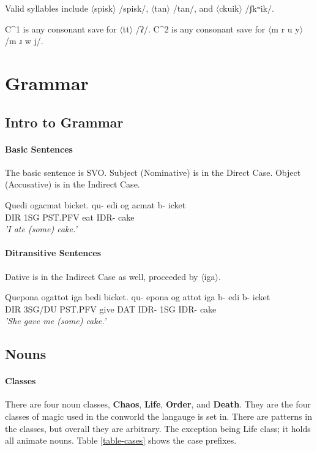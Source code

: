 \documentclass[11pt]{article}
\begin{document}
Valid syllables include 
$\langle$spisk$\rangle$ /spisk/,
$\langle$tan$\rangle$ /tan/,
and $\langle$ckuik$\rangle$ /ʃkʷik/.

C^1 is any consonant save for $\langle$tt$\rangle$ /ʔ/.
C^2 is any consonant save for $\langle$m r u y$\rangle$ /m ɹ w j/.

\newpage
\section{Grammar}

\subsection{Intro to Grammar}

\paragraph{Basic Sentences}
The basic sentence is SVO.
Subject (Nominative) is in the Direct Case.
Object (Accusative) is in the Indirect Case.

\begin{exe}
\ex \label{basicsentence}
Quedi ogacmat bicket.
\gll
qu-  edi og      acmat b-   icket\\
DIR  1SG PST.PFV eat   IDR- cake\\
\trans 
    \textit{'I ate (some) cake.'}\\
\end{exe}

\paragraph{Ditransitive Sentences}
Dative is in the Indirect Case as well, proceeded by $\langle$iga$\rangle$.

\begin{exe}
\ex \label{basicsentence}
Quepona ogattot iga bedi bicket.
\gll
qu-  epona  og      attot iga b-   edi b-   icket\\
DIR  3SG/DU PST.PFV give  DAT IDR- 1SG IDR- cake\\
\trans 
    \textit{'She gave me (some) cake.'}\\
\end{exe}


\subsection{Nouns}

\paragraph{Classes}
There are four noun classes,
\textbf{Chaos}, \textbf{Life}, \textbf{Order}, and \textbf{Death}.
They are the four classes of magic used in the conworld the langauge is set in.
There are patterns in the classes, but overall they are arbitrary.
The exception being Life class;
it holds all animate nouns.
Table \ref{table-cases} shows the case prefixes.
\end{document}
